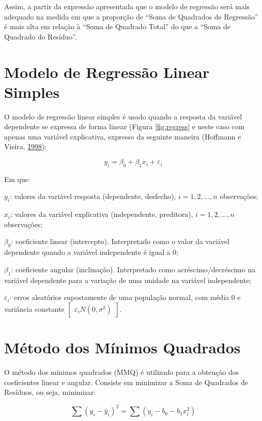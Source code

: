 \documentclass[12pt,brazil,oneside]{book}
\begin{document}
Assim, a partir da expressão apresentada que o modelo de regressão será mais adequado na medida em que a proporção de ``Soma de Quadrados de Regressão'' é mais alta em relação à ``Soma de Quadrado Total'' do que a ``Soma de Quadrado do Resíduo''.

\hypertarget{modelo-de-regressao-linear-simples}{%
\section{Modelo de Regressão Linear Simples}\label{modelo-de-regressao-linear-simples}}

O modelo de regressão linear simples é usado quando a resposta da variável dependente se expressa de forma linear (Figura \ref{fig:regress} e neste caso com apenas uma variável explicativa, expresso da seguinte maneira (Hoffmann e Vieira, \protect\hyperlink{ref-hoffmann1998}{1998}):

\[
y_i=\beta_0+\beta_1x_i+\varepsilon _i
\]

Em que:

\(y_i\): valores da variável resposta (dependente, desfecho), \(i = 1,2,...,n\) observações;

\(x_i\): valores da variável explicativa (independente, preditora), \(i = 1,2,...,n\) observações;

\(\beta_0\): coeficiente linear (intercepto). Interpretado como o valor da variável dependente quando a variável independente é igual a 0;

\(\beta_1\): coeficiente angular (inclinação). Interpretado como acréscimo/decréscimo na variável dependente para a variação de uma unidade na variável independente;

\(\varepsilon_i\): erros aleatórios supostamente de uma população normal, com média 0 e variância constante \(\begin{bmatrix}\varepsilon_i N(0, \sigma^2)\end{bmatrix}\).

\hypertarget{metodo-dos-minimos-quadrados}{%
\section{Método dos Mínimos Quadrados}\label{metodo-dos-minimos-quadrados}}

O método dos mínimos quadrados (MMQ) é utilizado para a obtenção dos coeficientes linear e angular. Consiste em minimizar a Soma de Quadrados de Resíduos, ou seja, minimizar:

\[
\sum (y_i-\hat y_i)^2=\sum (y_i-b_0-b_1x_i^2)
\]
\end{document}
